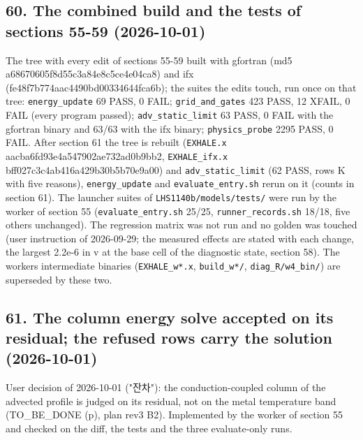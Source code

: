 \documentclass[english,a4paper]{my_memo}
\begin{document}
\subsection{60. The combined build and the tests of sections 55-59 (2026-10-01)}\label{60-the-combined-build-and-the-tests-of-sections-55-59-2026-10-01}

The tree with every edit of sections 55-59 built with gfortran (md5
a68670605f8d55c3a84e8c5ce4e04ca8) and ifx (fe48f7b774aac4490bd00334644fca6b);
the suites the edits touch, run once on that tree: \texttt{energy\_update} 69 PASS,
0 FAIL; \texttt{grid\_and\_gates} 423 PASS, 12 XFAIL, 0 FAIL (every program passed);
\texttt{adv\_static\_limit} 63 PASS, 0 FAIL with the gfortran binary and 63/63 with
the ifx binary; \texttt{physics\_probe} 2295 PASS, 0 FAIL. After section 61 the tree
is rebuilt (\texttt{EXHALE.x} aacba6fd93e4a547902ae732ad0b9bb2, \texttt{EXHALE\_ifx.x}
bff027c3c4ab416a429b30b5b70e9a00) and \texttt{adv\_static\_limit} (62 PASS, rows K
with five reasons), \texttt{energy\_update} and \texttt{evaluate\_entry.sh} rerun on it
(counts in section 61). The launcher suites of \texttt{LHS1140b/models/tests/} were run
by the worker of section 55 (\texttt{evaluate\_entry.sh} 25/25, \texttt{runner\_records.sh}
18/18, five others unchanged). The regression matrix was not run and no
golden was touched (user instruction of 2026-09-29; the measured effects
are stated with each change, the largest 2.2e-6 in v at the base cell of
the diagnostic state, section 58). The workers\textquotesingle{}
intermediate binaries (\texttt{EXHALE\_w*.x}, \texttt{build\_w*/}, \texttt{diag\_R/w4\_bin/}) are
superseded by these two.

\subsection{61. The column energy solve accepted on its residual; the refused rows carry the solution (2026-10-01)}\label{61-the-column-energy-solve-accepted-on-its-residual-the-refused-rows-carry-the-solution-2026-10-01}

User decision of 2026-10-01 ("잔차"): the conduction-coupled column of the
advected profile is judged on its residual, not on the metal temperature
band (TO\_BE\_DONE (p), plan rev3 B2). Implemented by the worker of section
55 and checked on the diff, the tests and the three evaluate-only runs.
\end{document}
